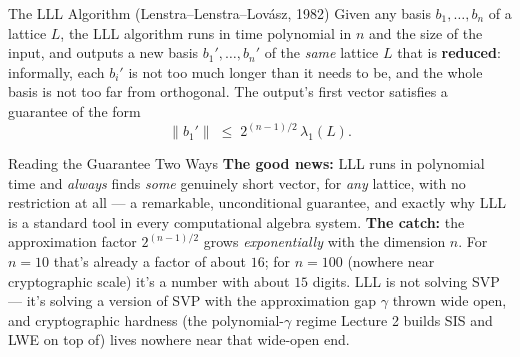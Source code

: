 \begin{defbox}{The LLL Algorithm (Lenstra--Lenstra--Lov\'asz, 1982)}
Given any basis $b_1,\ldots,b_n$ of a lattice $L$, the LLL algorithm runs in time polynomial in $n$ and the size of the input, and outputs a new basis $b_1',\ldots,b_n'$ of the \emph{same} lattice $L$ that is \textbf{reduced}: informally, each $b_i'$ is not too much longer than it needs to be, and the whole basis is not too far from orthogonal. The output's first vector satisfies a guarantee of the form
$$
\|b_1'\| \;\le\; 2^{(n-1)/2}\,\lambda_1(L).
$$
\end{defbox}

\begin{rmkbox}{Reading the Guarantee Two Ways}
\textbf{The good news:} LLL runs in polynomial time and \emph{always} finds \emph{some} genuinely short vector, for \emph{any} lattice, with no restriction at all --- a remarkable, unconditional guarantee, and exactly why LLL is a standard tool in every computational algebra system. \textbf{The catch:} the approximation factor $2^{(n-1)/2}$ grows \emph{exponentially} with the dimension $n$. For $n=10$ that's already a factor of about $16$; for $n=100$ (nowhere near cryptographic scale) it's a number with about $15$ digits. LLL is not solving SVP --- it's solving a version of SVP with the approximation gap $\gamma$ thrown wide open, and cryptographic hardness (the polynomial-$\gamma$ regime Lecture 2 builds SIS and LWE on top of) lives nowhere near that wide-open end.
\end{rmkbox}


